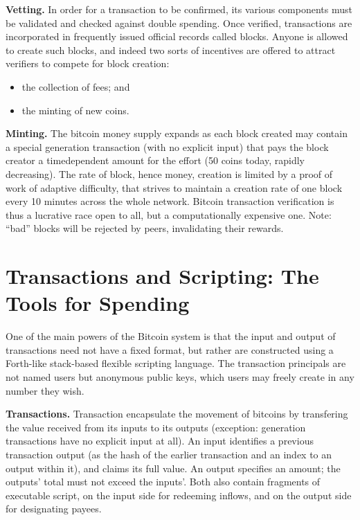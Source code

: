 \textbf{Vetting.} In order for a transaction to be confirmed, its various components must be
validated and checked against double spending. Once verified, transactions are incorporated
in frequently issued official records called blocks\cite{barber2012bitter}. Anyone is allowed to create
such blocks, and indeed two sorts of incentives are offered to attract verifiers to compete
for block creation: 
\begin{itemize}
	\item the collection of fees; and 
	\item the minting of new coins.
\end{itemize}

\textbf{Minting.} The bitcoin money supply expands as each block created may contain a special
generation transaction (with no explicit input) that pays the block creator a timedependent
amount for the effort (50 coins today, rapidly decreasing). The rate of block,
hence money, creation is limited by a proof of work of adaptive difficulty, that strives to
maintain a creation rate of one block every 10 minutes across the whole network. Bitcoin
transaction verification is thus a lucrative race open to all, but a computationally
expensive one. Note: “bad” blocks will be rejected by peers, invalidating their rewards\cite{barber2012bitter}.

\section{Transactions and Scripting: The Tools for Spending}
One of the main powers of the Bitcoin system is that the input and output of transactions
need not have a fixed format, but rather are constructed using a Forth-like stack-based
flexible scripting language\cite{barber2012bitter}. The transaction principals are not named users
but anonymous public keys, which users may freely create in any number they wish.

\textbf{Transactions.} Transaction encapsulate the movement of bitcoins by transfering the
value received from its inputs to its outputs (exception: generation transactions have
no explicit input at all). An input identifies a previous transaction output (as the hash
of the earlier transaction and an index to an output within it), and claims its full value.
An output specifies an amount; the outputs’ total must not exceed the inputs’. Both also
contain fragments of executable script, on the input side for redeeming inflows, and on
the output side for designating payees.

